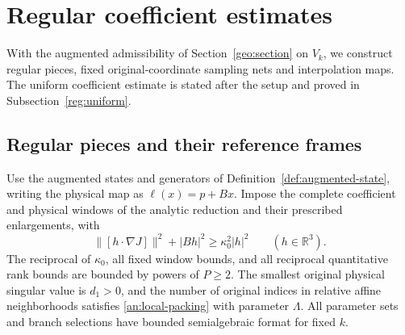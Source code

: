 \documentclass[11pt]{amsart}
\theoremstyle{definition}
\theoremstyle{remark}
\numberwithin{equation}{section}
\begin{document}
\section{Regular coefficient estimates}\label{reg:geometry-section}\label{reg:section}

With the augmented admissibility of Section~\ref{geo:section} on $V_k$, we construct regular pieces, fixed original-coordinate sampling nets and interpolation maps. The uniform coefficient estimate is stated after the setup and proved in Subsection~\ref{reg:uniform}.

\subsection{Regular pieces and their reference frames}\label{reg:common-pieces}\label{reg:preparation}
Use the augmented states and generators of Definition~\ref{def:augmented-state}, writing the physical map as $\ell(x)=p+Bx$. Impose the complete coefficient and physical windows of the analytic reduction and their prescribed enlargements, with
\begin{equation}\label{reg:stop}
\|[h\cdot\nabla J]\|^2+|Bh|^2\ge\kappa_0^2|h|^2\qquad(h\in\mathbb R^3).
\end{equation}
The reciprocal of $\kappa_0$, all fixed window bounds, and all reciprocal quantitative rank bounds are bounded by powers of $P\ge2$. The smallest original physical singular value is $d_1>0$, and the number of original indices in relative affine neighborhoods satisfies \eqref{an:local-packing} with parameter $\Lambda$. All parameter sets and branch selections have bounded semialgebraic format for fixed $k$.
\end{document}

